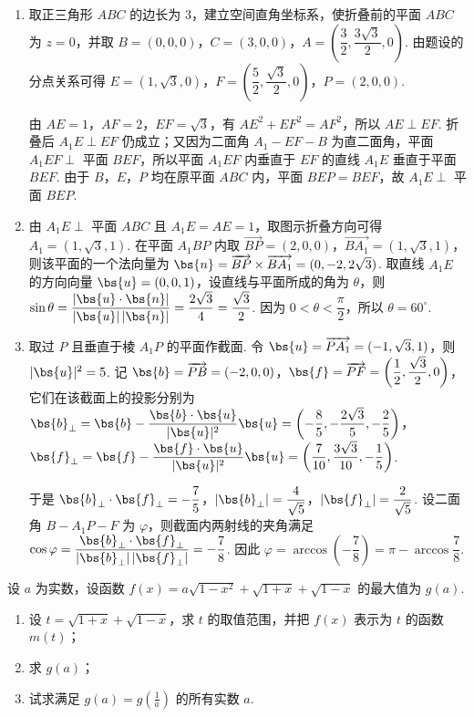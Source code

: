 \begin{solution}
\begin{enumerate}
\item 取正三角形 \(ABC\) 的边长为 \(3\)，建立空间直角坐标系，使折叠前的平面 \(ABC\) 为 \(z=0\)，并取
\(B=(0,0,0)\)，\(C=(3,0,0)\)，\(A=\left(\dfrac32,\dfrac{3\sqrt3}{2},0\right)\). 由题设的分点关系可得 \(E=(1,\sqrt3,0)\)，\(F=\left(\dfrac52,\dfrac{\sqrt3}{2},0\right)\)，\(P=(2,0,0)\).

由 \(AE=1\)，\(AF=2\)，\(EF=\sqrt3\)，有 \(AE^2+EF^2=AF^2\)，所以 \(AE\perp EF\). 折叠后 \(A_1E\perp EF\) 仍成立；又因为二面角 \(A_1-EF-B\) 为直二面角，平面 \(A_1EF\perp\) 平面 \(BEF\)，所以平面 \(A_1EF\) 内垂直于 \(EF\) 的直线 \(A_1E\) 垂直于平面 \(BEF\). 由于 \(B\)，\(E\)，\(P\) 均在原平面 \(ABC\) 内，平面 \(BEP=BEF\)，故 \(A_1E\perp\) 平面 \(BEP\).
\item 由 \(A_1E\perp\) 平面 \(ABC\) 且 \(A_1E=AE=1\)，取图示折叠方向可得 \(A_1=(1,\sqrt3,1)\). 在平面 \(A_1BP\) 内取 \(\overrightarrow{BP}=(2,0,0)\)，\(\overrightarrow{BA_1}=(1,\sqrt3,1)\)，则该平面的一个法向量为
\(\bs{n}=\overrightarrow{BP}\times\overrightarrow{BA_1}=(0,-2,2\sqrt3)\). 取直线 \(A_1E\) 的方向向量 \(\bs{u}=(0,0,1)\)，设直线与平面所成的角为 \(\theta\)，则
\(\sin\theta=\dfrac{|\bs{u}\cdot\bs{n}|}{|\bs{u}|\,|\bs{n}|}=\dfrac{2\sqrt3}{4}=\dfrac{\sqrt3}{2}\). 因为 \(0<\theta<\dfrac\pi2\)，所以 \(\theta=60^{\circ}\).
\item 取过 \(P\) 且垂直于棱 \(A_1P\) 的平面作截面. 令 \(\bs{u}=\overrightarrow{PA_1}=(-1,\sqrt3,1)\)，则 \(|\bs{u}|^2=5\). 记 \(\bs{b}=\overrightarrow{PB}=(-2,0,0)\)，\(\bs{f}=\overrightarrow{PF}=\left(\dfrac12,\dfrac{\sqrt3}{2},0\right)\)，它们在该截面上的投影分别为
\(\bs{b}_{\perp}=\bs{b}-\dfrac{\bs{b}\cdot\bs{u}}{|\bs{u}|^2}\bs{u}=\left(-\dfrac85,-\dfrac{2\sqrt3}{5},-\dfrac25\right)\)，
\(\bs{f}_{\perp}=\bs{f}-\dfrac{\bs{f}\cdot\bs{u}}{|\bs{u}|^2}\bs{u}=\left(\dfrac7{10},\dfrac{3\sqrt3}{10},-\dfrac15\right)\).

于是 \(\bs{b}_{\perp}\cdot\bs{f}_{\perp}=-\dfrac75\)，\(|\bs{b}_{\perp}|=\dfrac4{\sqrt5}\)，\(|\bs{f}_{\perp}|=\dfrac2{\sqrt5}\). 设二面角 \(B-A_1P-F\) 为 \(\varphi\)，则截面内两射线的夹角满足
\(\cos\varphi=\dfrac{\bs{b}_{\perp}\cdot\bs{f}_{\perp}}{|\bs{b}_{\perp}|\,|\bs{f}_{\perp}|}=-\dfrac78\). 因此 \(\varphi=\arccos\left(-\dfrac78\right)=\pi-\arccos\dfrac78\).
\end{enumerate}
\end{solution}

\begin{problem}
设 \(a\) 为实数，设函数 \(f(x) = a\sqrt{1 - x^2} + \sqrt{1 + x} + \sqrt{1 - x}\) 的最大值为 \(g(a)\).

\begin{enumerate}
\item 设 \(t = \sqrt{1 + x} + \sqrt{1 - x}\)，求 \(t\) 的取值范围，并把 \(f(x)\) 表示为 \(t\) 的函数 \(m(t)\)；
\item 求 \(g(a)\)；
\item 试求满足 \(g(a) = g\left(\frac{1}{a}\right)\) 的所有实数 \(a\).
\end{enumerate}
\end{problem}

